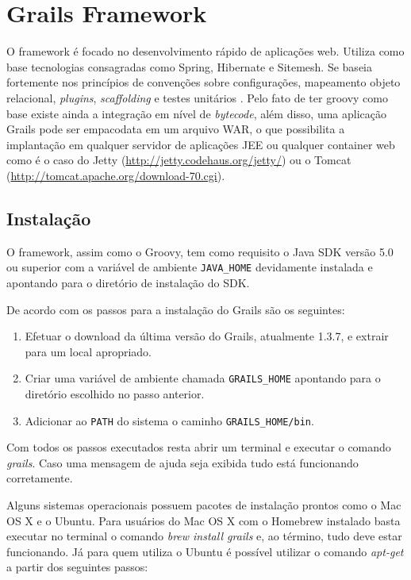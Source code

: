 \documentclass[12pt]{article}
\begin{document}
\section{Grails Framework}
    O framework é focado no desenvolvimento rápido de aplicações web. Utiliza como
    base tecnologias consagradas como Spring, Hibernate e Sitemesh. Se baseia 
    fortemente nos princípios de convenções sobre configurações, mapeamento objeto
    relacional, \emph{plugins}, \emph{scaffolding} e testes unitários \cite{beginingGroovy:2008}.
    Pelo fato de ter groovy como base existe ainda a integração em nível de \emph{bytecode},
    além disso, uma aplicação Grails pode ser empacodata em um arquivo WAR, o que 
    possibilita a implantação em qualquer servidor de aplicações JEE ou qualquer
    container web como é o caso do Jetty (\url{http://jetty.codehaus.org/jetty/})
    ou o Tomcat (\url{http://tomcat.apache.org/download-70.cgi}).
    
\subsection{Instalação}
    
    O framework, assim como o Groovy, tem como requisito o Java SDK versão 5.0 ou 
    superior com a variável de ambiente \texttt{JAVA\_HOME} devidamente instalada 
    e apontando para o diretório de instalação do SDK. 
    
    De acordo com \cite{grails} os passos para a instalação do Grails são os seguintes:
    \begin{enumerate}
        \item Efetuar o download da última versão do Grails, atualmente 1.3.7, e extrair
              para um local apropriado.
        \item Criar uma variável de ambiente chamada \texttt{GRAILS\_HOME} apontando para
              o diretório escolhido no passo anterior.
        \item Adicionar ao \texttt{PATH} do sistema o caminho \texttt{GRAILS\_HOME/bin}.
    \end{enumerate}

    Com todos os passos executados resta abrir um terminal e executar o comando 
    \emph{grails}. Caso uma mensagem de ajuda seja exibida tudo está funcionando corretamente. 

    Alguns sistemas operacionais possuem pacotes de instalação prontos como o Mac
    OS X e o Ubuntu. Para usuários do Mac OS X com o Homebrew instalado basta executar
    no terminal o comando \emph{brew install grails} e, ao término, tudo deve 
    estar funcionando. Já para quem utiliza o Ubuntu é possível utilizar o comando 
    \emph{apt-get} a partir dos seguintes passos:
    
\end{document}
